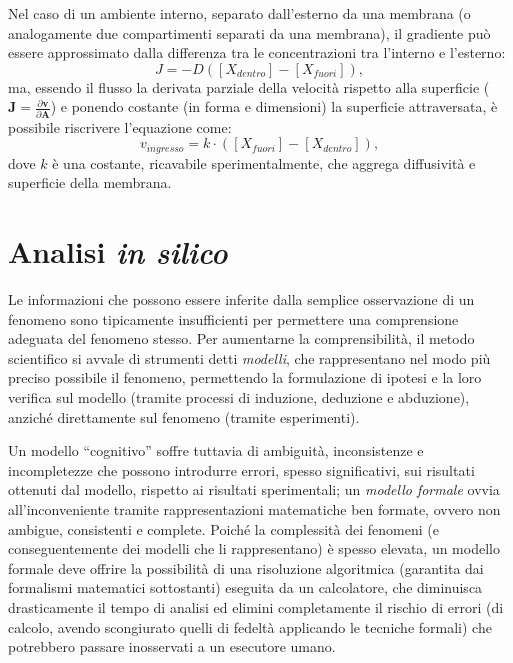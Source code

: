 	Nel caso di un ambiente interno, separato dall'esterno da una membrana (o analogamente due compartimenti separati da una membrana), il gradiente pu\`o essere approssimato dalla differenza tra le concentrazioni tra l'interno e l'esterno:
	\begin{equation*}
		J = -D ([X_{dentro}] - [X_{fuori}]),
	\end{equation*}
	ma, essendo il flusso la derivata parziale della velocit\`a rispetto alla superficie ($\mathbf{J} = \frac{\partial\mathbf{v}}{\partial\mathbf{A}}$) e ponendo costante (in forma e dimensioni) la superficie attraversata, \`e possibile riscrivere l'equazione come:
	\begin{equation}\label{eq:diffusione}
	v_{ingresso} = k \cdot ([X_{fuori}] - [X_{dentro}]),
	\end{equation}
	dove $k$ \`e una costante, ricavabile sperimentalmente, che aggrega diffusivit\`a e superficie della membrana.
	
		
	\section{Analisi \emph{in silico}}\label{sez:silico}
		Le informazioni che possono essere inferite dalla semplice osservazione di un fenomeno sono tipicamente insufficienti per permettere una comprensione adeguata del fenomeno stesso.
		Per aumentarne la comprensibilit\`a, il metodo scientifico si avvale di strumenti detti \emph{modelli}, che rappresentano nel modo pi\`u preciso possibile il fenomeno, permettendo la formulazione di ipotesi e la loro verifica sul modello (tramite processi di induzione, deduzione e abduzione), anzich\'e direttamente sul fenomeno (tramite esperimenti).
		
		Un modello ``cognitivo'' soffre tuttavia di ambiguit\`a, inconsistenze e incompletezze che possono introdurre errori, spesso significativi, sui risultati ottenuti dal modello, rispetto ai risultati sperimentali; un \emph{modello formale} ovvia all'inconveniente tramite rappresentazioni matematiche ben formate, ovvero non ambigue, consistenti e complete.
		Poich\'e la complessit\`a dei fenomeni (e conseguentemente dei modelli che li rappresentano) \`e spesso elevata, un modello formale deve offrire la possibilit\`a di una risoluzione algoritmica (garantita dai formalismi matematici sottostanti) eseguita da un calcolatore, che diminuisca drasticamente il tempo di analisi ed elimini completamente il rischio di errori (di calcolo, avendo scongiurato quelli di fedelt\`a applicando le tecniche formali) che potrebbero passare inosservati a un esecutore umano.
		
